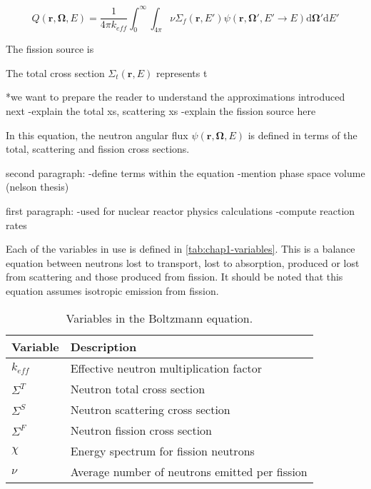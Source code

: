 \begin{dmath}
\label{eqn:chap1-source}
Q(\mathbf{r},\mathbf{\Omega},E) = \frac{1}{4\pi k_{eff}}\int_{0}^{\infty}\int_{4\pi} \nu\Sigma_{f}(\mathbf{r},E')\psi(\mathbf{r},\mathbf{\Omega'},{E'\rightarrow E}) \mathrm{d}\mathbf{\Omega'} \mathrm{d}E'
\end{dmath}

The fission source is 

The total cross section $\Sigma_{t}(\mathbf{r},E)$ represents t


*we want to prepare the reader to understand the approximations introduced next
-explain the total xs, scattering xs
-explain the fission source here

In this equation, the neutron angular flux $\psi(\mathbf{r},\mathbf{\Omega},E)$ is defined in terms of the total, scattering and fission cross sections. 

second paragraph:
-define terms within the equation
-mention phase space volume (nelson thesis)

first paragraph:
-used for nuclear reactor physics calculations
-compute reaction rates

Each of the variables in use is defined in \autoref{tab:chap1-variables}. This is a balance equation between neutrons lost to transport, lost to absorption, produced or lost from scattering and those produced from fission. It should be noted that this equation assumes isotropic emission from fission.

\begin{table}[hbt]
  \caption{Variables in the Boltzmann equation.}
  \label{tab:chap1-variables}
  \begin{center}
    \begin{tabular}{ l l }
    \toprule
    Variable & Description \\
    \midrule
    $k_{eff}$ & Effective neutron multiplication factor \\
    $\Sigma^T$ & Neutron total cross section \\
    $\Sigma^S$ & Neutron scattering cross section \\
    $\Sigma^F$ & Neutron fission cross section \\
    $\chi$ & Energy spectrum for fission neutrons \\
    $\nu$ & Average number of neutrons emitted per fission \\
    \bottomrule
  \end{tabular}
  \end{center}
\end{table}

